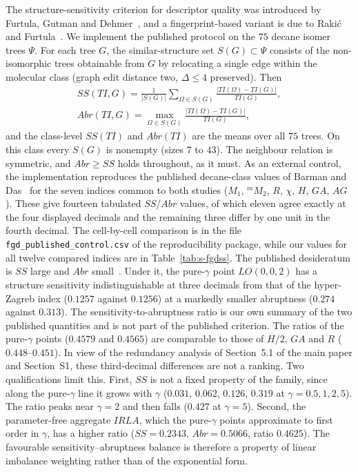 \documentclass[a5paper, 10pt]{article}
\theoremstyle{plain}
\theoremstyle{remark}
\theoremstyle{definition}
\begin{document}
The structure-sensitivity criterion for descriptor quality was
introduced by Furtula, Gutman and
Dehmer~\cite{FurtulaGutmanDehmer2013SS}, and a fingerprint-based
variant is due to Raki\'c and Furtula~\cite{RakicFurtula2019SS}. We
implement the published protocol on the $75$ decane isomer trees
$\Psi$. For each tree $G$, the similar-structure set
$S(G) \subset \Psi$ consists of the non-isomorphic trees obtainable
from $G$ by relocating a single edge within the molecular class
(graph edit distance two, $\Delta \le 4$ preserved). Then
\begin{gather*}
SS(TI, G) = \frac{1}{|S(G)|} \sum_{\Omega \in S(G)}
\frac{|TI(\Omega) - TI(G)|}{TI(G)},\\
Abr(TI, G) = \max_{\Omega \in S(G)}
\frac{|TI(\Omega) - TI(G)|}{TI(G)},
\end{gather*}
and the class-level $SS(TI)$ and $Abr(TI)$ are the means over all
$75$ trees. On this class every $S(G)$ is nonempty (sizes $7$ to
$43$). The neighbour relation is symmetric, and $Abr \ge SS$ holds
throughout, as it must. As an external control, the implementation
reproduces the published decane-class values of Barman and
Das~\cite{BarmanDas2026HSO} for the seven indices common to both
studies ($M_1$, ${}^{m}\!M_2$, $R$, $\chi$, $H$, $GA$, $AG$). These
give fourteen tabulated $SS$/$Abr$ values, of which eleven agree exactly
at the four displayed decimals and the remaining three differ by one
unit in the fourth decimal. The cell-by-cell comparison is in the file
\texttt{fgd\_published\_control.csv} of the reproducibility package,
while our values for all twelve compared indices are in
Table~\ref{tab:s-fgdss}. The published desideratum is $SS$ large
and $Abr$ small~\cite{FurtulaGutmanDehmer2013SS}. Under it, the
pure-$\gamma$ point $LO(0,0,2)$ has a structure sensitivity
indistinguishable at three decimals from that of the hyper-Zagreb
index ($0.1257$ against $0.1256$) at a
markedly smaller abruptness ($0.274$ against $0.313$). The
sensitivity-to-abruptness ratio is our own summary of the two published
quantities and is not part of the published criterion. The ratios of the
pure-$\gamma$ points
($0.4579$ and $0.4565$) are comparable to those of $H/2$, $GA$ and
$R$ ($0.448$--$0.451$). In view of the redundancy analysis of
Section~5.1 of the main paper and Section~S1, these third-decimal
differences are not a ranking. Two qualifications limit this. First,
$SS$ is not a fixed property of the family, since along the pure-$\gamma$
line it grows with $\gamma$ ($0.031$, $0.062$, $0.126$, $0.319$ at
$\gamma = 0.5, 1, 2, 5$). The ratio peaks near $\gamma = 2$ and then
falls ($0.427$ at $\gamma = 5$). Second, the parameter-free aggregate
$IRLA$, which the pure-$\gamma$ points approximate to first order in
$\gamma$, has a higher ratio ($SS = 0.2343$, $Abr = 0.5066$, ratio
$0.4625$). The favourable sensitivity--abruptness balance is
therefore a property of linear imbalance weighting rather than of the
exponential form.
\end{document}
